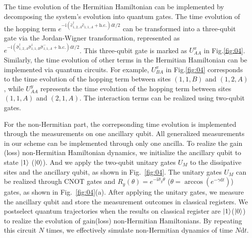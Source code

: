\documentclass[longbibliography, aps, prx, amsmath, amssymb, amsfonts, twocolumn,superscriptaddress, footinbib]{revtex4-1}
\begin{document}
	The time evolution of the Hermitian Hamiltonian can be implemented by decomposing the system's evolution into quantum gates. The time evolution of the hopping term $e^{-\mathrm{i} (\hat{c}_{1,2,A}^{\dagger} \hat{c}_{1,1,A} + \text{h.c.})\mathrm{d} t/2}$ can be transformed into a three-qubit gate via the Jordan-Wigner transformation, represented as $e^{-\mathrm{i} (\hat{\sigma}_{1,2,A}^{\dagger} \hat{\sigma}^z_{1,1,B}\hat{\sigma}_{1,1,A}^{-} + \text{h.c.})\mathrm{d} t/2}$. This three-qubit gate is marked as $U_{AA}^x$ in Fig.\ref{fig:04}. Similarly, the time evolution of other terms in the Hermitian Hamiltonian can be implemented via quantum circuits. For example, $U_{BA}^x$ in Fig.\ref{fig:04} corresponds to the time evolution of the hopping term between sites $(1,1,B)$ and $(1,2,A)$, while $U_{AA}^y$ represents the time evolution of the hopping term between sites $(1,1,A)$ and $(2,1,A)$. The interaction terms can be realized using two-qubit gates.

	For the non-Hermitian part, the correpsonding time evolution is implemented through the measurements on one ancillary qubit. 
	All generalized measurements in our scheme can be implemented through only one ancilla. To realize the gain (loss) non-Hermitian Hamiltonian dynamics, we initialize the ancillary qubit to state $\ket{1}$ ($\ket{0}$). And we apply the two-qubit unitary gates $U_M$ to the dissipative sites and the ancillary qubit, as shown in Fig.~\ref{fig:04}. The unitary gates $U_M$ can be realized through CNOT gates and $R_y(\theta) = e^{-\mathrm{i} \hat{\sigma}_y \theta}$ ($\theta = \arccos(e^{-\gamma \mathrm{d}t})$) gates, as shown in Fig.~\ref{fig:04}(a). 
	After applying the unitary gates, we measure the ancillary qubit and store the measurement outcomes in classical registers. 
	We postselect quantum trajectories when the results on classical register are $\ket{1}$($\ket{0}$) to realize the evolution of gain(loss) non-Hermitian Hamiltonians. By repeating this circuit $N$ times, we effectively simulate non-Hermitian dynamics of time $N\mathrm{d}t$.
\end{document}
